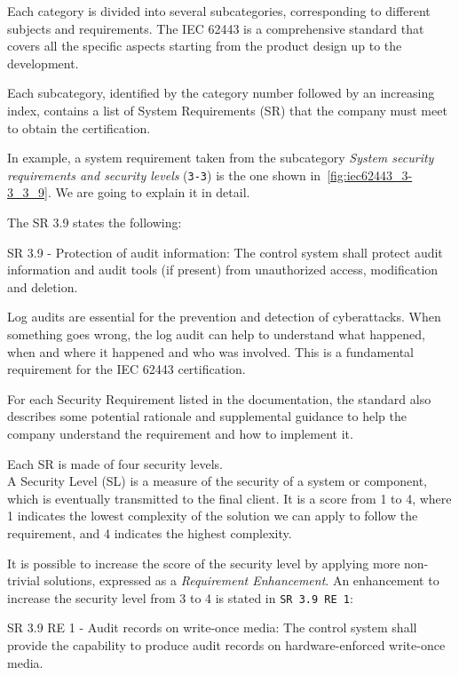 Each category is divided into several subcategories, corresponding to different subjects and requirements. The IEC 62443 is a comprehensive standard that covers all the specific aspects starting from the product design up to the development.

Each subcategory, identified by the category number followed by an increasing index, contains a list of System Requirements (SR) that the company must meet to obtain the certification.

In example, a system requirement taken from the subcategory \textit{System security requirements and security levels} (\texttt{3-3}) is the one shown in~\cref{fig:iec62443_3-3_3_9}. We are going to explain it in detail.

The SR 3.9 states the following:
\begin{mdframed}
  SR 3.9 - Protection of audit information: The control system shall protect audit information and audit tools (if present) from unauthorized access, modification and deletion.
\end{mdframed}\label{sr:3-3_3-9}

Log audits are essential for the prevention and detection of cyberattacks. When something goes wrong, the log audit can help to understand what happened, when and where it happened and who was involved. This is a fundamental requirement for the IEC 62443 certification.

For each Security Requirement listed in the documentation, the standard also describes some potential rationale and supplemental guidance to help the company understand the requirement and how to implement it.

Each SR is made of four security levels. \\
A Security Level (SL) is a measure of the security of a system or component, which is eventually transmitted to the final client. It is a score from 1 to 4, where 1 indicates the lowest complexity of the solution we can apply to follow the requirement, and 4 indicates the highest complexity.~\cite{ixon-practical-guide-iec-62443}

It is possible to increase the score of the security level by applying more non-trivial solutions, expressed as a \textit{Requirement Enhancement}. An enhancement to increase the security level from 3 to 4 is stated in \texttt{SR 3.9 RE 1}:
\begin{mdframed}
  SR 3.9 RE 1 - Audit records on write-once media: The control system shall provide the capability to produce audit records on hardware-enforced write-once media.
\end{mdframed}\label{sr:3-3_3-9_re1}

